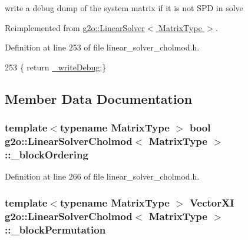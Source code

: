 write a debug dump of the system matrix if it is not S\+PD in solve 



Reimplemented from \hyperlink{classg2o_1_1LinearSolver_a8b6a84bd88f1bbc13d2c80c3a14d4693}{g2o\+::\+Linear\+Solver$<$ Matrix\+Type $>$}.



Definition at line 253 of file linear\+\_\+solver\+\_\+cholmod.\+h.


\begin{DoxyCode}
253 \{ \textcolor{keywordflow}{return} \hyperlink{classg2o_1_1LinearSolverCholmod_ab13b752d37f43b2d8e1e4b2c7002b054}{\_writeDebug};\}
\end{DoxyCode}


\subsection{Member Data Documentation}
\subsubsection[{\texorpdfstring{\+\_\+block\+Ordering}{_blockOrdering}}]{\setlength{\rightskip}{0pt plus 5cm}template$<$typename Matrix\+Type $>$ bool {\bf g2o\+::\+Linear\+Solver\+Cholmod}$<$ Matrix\+Type $>$\+::\+\_\+block\+Ordering\hspace{0.3cm}{\ttfamily [protected]}}\hypertarget{classg2o_1_1LinearSolverCholmod_a1451c262710d169b6a21e06ca1165337}{}\label{classg2o_1_1LinearSolverCholmod_a1451c262710d169b6a21e06ca1165337}


Definition at line 266 of file linear\+\_\+solver\+\_\+cholmod.\+h.

\subsubsection[{\texorpdfstring{\+\_\+block\+Permutation}{_blockPermutation}}]{\setlength{\rightskip}{0pt plus 5cm}template$<$typename Matrix\+Type $>$ {\bf Vector\+XI} {\bf g2o\+::\+Linear\+Solver\+Cholmod}$<$ Matrix\+Type $>$\+::\+\_\+block\+Permutation\hspace{0.3cm}{\ttfamily [protected]}}\hypertarget{classg2o_1_1LinearSolverCholmod_a6dc3dd0af697846996d6ca72da72ffbd}{}\label{classg2o_1_1LinearSolverCholmod_a6dc3dd0af697846996d6ca72da72ffbd}


